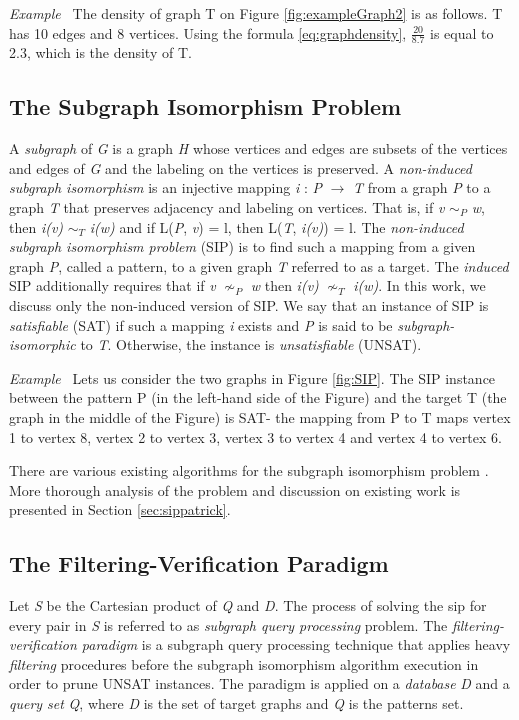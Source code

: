 \documentclass{l4proj}
\newcounter{example}[section]
\newenvironment{example}[1][]{\refstepcounter{example}\par\medskip
   \noindent \textit{Example~\theexample #1} \rmfamily}{\medskip}
\begin{document}
\begin{example}
The density of graph T on Figure \ref{fig:exampleGraph2} is as follows. T has 10 edges and 8 vertices. Using the formula \ref{eq:graphdensity}, $\frac{20}{8.7}$ is equal to 2.3, which is the density of T.
\end{example}

\subsection{The Subgraph Isomorphism Problem}
A \emph{subgraph} of \emph{G} is a graph \emph{H} whose vertices and edges are subsets of the vertices and edges of \emph{G} and the labeling on the vertices is preserved.
A \emph{non-induced subgraph isomorphism} is an injective mapping \emph{i} : \emph{P} $\rightarrow$ \emph{T} from a graph \emph{P} to a graph \emph{T} that preserves adjacency and labeling on vertices. That is, if \emph{v} $\sim_{P}$ \emph{w}, then \emph{i(v)} $\sim_{T}$ \emph{i(w)} and if L(\emph{P}, \emph{v}) = l, then L(\emph{T}, \emph{i(v)}) = l. The \emph{non-induced subgraph isomorphism problem} (SIP) is to find such a mapping from a given graph \emph{P}, called a pattern, to a given graph \emph{T} referred to as a target. The \emph{induced} SIP additionally requires that if \emph{v} $\nsim_{P}$ \emph{w} then \emph{i(v)} $\nsim_{T}$ \emph{i(w)}. In this work, we discuss only the non-induced version of SIP. We say that an instance of SIP is \emph{satisfiable} (SAT) if such a mapping \emph{i} exists and \emph{P} is said to be \emph{subgraph-isomorphic} to \emph{T}. Otherwise, the instance is \emph{unsatisfiable} (UNSAT).

\begin{example}
\label{ex:sip}
Lets us consider the two graphs in Figure \ref{fig:SIP}. The SIP instance between the pattern P (in the left-hand side of the Figure) and the target T (the graph in the middle of the Figure) is SAT- the mapping from P to T maps vertex 1 to vertex 8, vertex 2 to vertex 3, vertex 3 to vertex 4 and vertex 4 to vertex 6.
\end{example}

There are various existing algorithms for the subgraph isomorphism problem \cite{vf2,Solnon:2010,CP2015,Larrosa:2002,Bonnici:2013,Zampelli:2010,nauty}. More thorough analysis of the problem and discussion on existing work is presented in Section \ref{sec:sippatrick}.

\subsection{The Filtering-Verification Paradigm}
Let \emph{S} be the Cartesian product of \emph{Q} and \emph{D}. The process of solving the \gls{sip} for every pair in \emph{S} is referred to as \emph{subgraph query processing} problem. The \emph{filtering-verification paradigm} is a subgraph query processing technique that applies heavy \emph{filtering} procedures before the subgraph isomorphism algorithm execution in order to prune UNSAT instances. The paradigm is applied on a \emph{database} \emph{D} and a \emph{query set} \emph{Q}, where \emph{D} is the set of target graphs and \emph{Q} is the patterns set.
\end{document}
